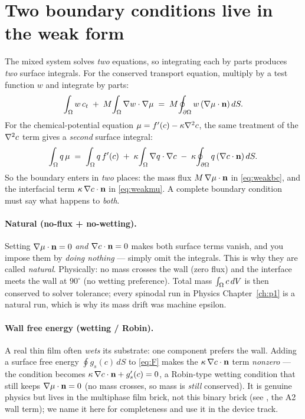 \section{Two boundary conditions live in the weak form}

The mixed system solves \emph{two} equations, so integrating each by
parts produces \emph{two} surface integrals. For the conserved transport
equation, multiply by a test function $w$ and integrate by parts:
%
\begin{equation}
  \int_\Omega w\,c_t\;+\;M\!\int_\Omega \nabla w\cdot\nabla\mu
  \;=\; M\!\oint_{\partial\Omega} w\,(\nabla\mu\cdot\mathbf n)\,dS .
  \label{eq:weakbc}
\end{equation}
%
For the chemical-potential equation $\mu = f'(c) - \kappa\nabla^2 c$, the
same treatment of the $\nabla^2 c$ term gives a \emph{second} surface
integral:
%
\begin{equation}
  \int_\Omega q\,\mu \;=\; \int_\Omega q\,f'(c) \;+\;\kappa\!\int_\Omega\nabla q\cdot\nabla c
  \;-\;\kappa\!\oint_{\partial\Omega} q\,(\nabla c\cdot\mathbf n)\,dS .
  \label{eq:weakmu}
\end{equation}
%
So the boundary enters in \emph{two} places: the mass flux
$M\,\nabla\mu\cdot\mathbf n$ in \eqref{eq:weakbc}, and the interfacial
term $\kappa\,\nabla c\cdot\mathbf n$ in \eqref{eq:weakmu}. A complete
boundary condition must say what happens to \emph{both}.

\paragraph{Natural (no-flux + no-wetting).}
Setting $\nabla\mu\cdot\mathbf n=0$ \emph{and}
$\nabla c\cdot\mathbf n=0$ makes both surface terms vanish, and you impose
them by \emph{doing nothing} --- simply omit the integrals. This is why
they are called \emph{natural}. Physically: no mass crosses the wall
(zero flux) and the interface meets the wall at $90^\circ$ (no wetting
preference). Total mass $\int_\Omega c\,dV$ is then conserved to solver
tolerance; every spinodal run in Physics Chapter~\ref{ch:p1} is a natural
run, which is why its mass drift was machine epsilon.

\paragraph{Wall free energy (wetting / Robin).}
A real thin film often \emph{wets} its substrate: one component prefers
the wall. Adding a surface free energy $\oint g_s(c)\,dS$ to
\eqref{eq:F} makes the $\kappa\,\nabla c\cdot\mathbf n$ term \emph{nonzero}
--- the condition becomes $\kappa\,\nabla c\cdot\mathbf n + g_s'(c) = 0$, a
Robin-type wetting condition that still keeps $\nabla\mu\cdot\mathbf n=0$
(no mass crosses, so mass is \emph{still} conserved). It is genuine
physics but lives in the multiphase film brick, not this binary brick
(see , the A2 wall term);
we name it here for completeness and use it in the device track.

